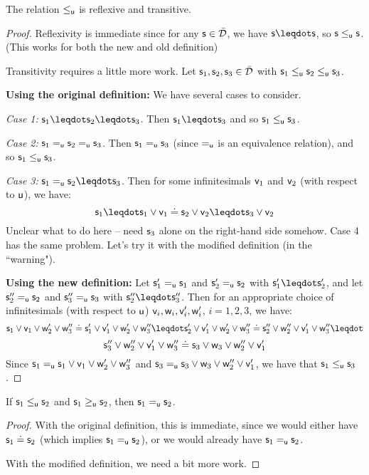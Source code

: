 \documentclass{article}
\begin{document}
\begin{prop}
The relation $\lequ$ is reflexive and transitive.  
\end{prop}
\begin{proof}
Reflexivity is immediate since for any $\stmt\in\tdomain$, we have $\stmt\finer\stmt$, so $\stmt\lequ\stmt$. (This works for both the new and old definition)

Transitivity requires a little more work. Let $\stmt_1,\stmt_2,\stmt_3\in\tdomain$ with $\stmt_1\lequ\stmt_2\lequ\stmt_3$. 

{\bf Using the original definition:}
We have several cases to consider. 

\emph{Case 1:} $\stmt_1\finer\stmt_2\finer\stmt_3$. Then $\stmt_1\finer\stmt_3$ and so $\stmt_1\lequ\stmt_3$. 

\emph{Case 2:} $\stmt_1\equ\stmt_2\equ\stmt_3$. Then $\stmt_1\equ\stmt_3$ (since $\equ$ is an equivalence relation), and so $\stmt_1\lequ\stmt_3$. 

\emph{Case 3:} $\stmt_1\equ\stmt_2\finer\stmt_3$. Then for some infinitesimals $\stmt[v]_1$ and $\stmt[v]_2$ (with respect to $\stmt[u]$), we have:
$$
\stmt_1\finer\stmt_1\OR\stmt[v]_1\eqgran\stmt_2\OR\stmt[v]_2\finer\stmt_3\OR\stmt[v]_2
$$
Unclear what to do here -- need $\stmt_3$ alone on the right-hand side somehow. Case 4 has the same problem. Let's try it with the modified definition (in the ``warning").

{\bf Using the new definition:}
Let $\stmt_1'\equ\stmt_1$ and $\stmt_2'\equ\stmt_2$ with $\stmt_1'\finer\stmt_2'$, and let $\stmt_2''\equ\stmt_2$ and $\stmt_3''\equ\stmt_3$ with $\stmt_2''\finer\stmt_3''$. 
Then for an appropriate choice of infinitesimals (with respect to $\stmt[u]$) $\stmt[v]_i,\stmt[w]_i,\stmt[v]_i',\stmt[w]_i'$, $i=1,2,3$, we have:
$$
\stmt_1\OR\stmt[v]_1\OR\stmt[w]_2'\OR\stmt[w]_3'' \eqgran \stmt_1'\OR\stmt[v]_1'\OR\stmt[w]_2'\OR\stmt[w]_3'' \finer \stmt_2'\OR\stmt[v]_1'\OR\stmt[w]_2'\OR\stmt[w]_3'' \eqgran \stmt_2''\OR\stmt[w]_2''\OR\stmt[v]_1'\OR\stmt[w]_3'' \finer
$$
$$
\stmt_3''\OR\stmt[w]_2''\OR\stmt[v]_1'\OR\stmt[w]_3'' \eqgran
\stmt_3\OR\stmt[w]_3 \OR\stmt[w]_2''\OR\stmt[v]_1'
$$
Since $\stmt_1 \equ \stmt_1\OR\stmt[v]_1\OR\stmt[w]_2'\OR\stmt[w]_3''$ and $\stmt_3 \equ \stmt_3\OR\stmt[w]_3 \OR\stmt[w]_2''\OR\stmt[v]_1' $, we have that $\stmt_1\lequ\stmt_3$. 

\end{proof}

\begin{prop}
If $\stmt_1\lequ\stmt_2$ and $\stmt_1\gequ \stmt_2$, then $\stmt_1\equ\stmt_2$.
\end{prop}
\begin{proof}
With the original definition, this is immediate, since we would either have $\stmt_1\eqgran\stmt_2$ (which implies $\stmt_1\equ\stmt_2$), or we would already have $\stmt_1\equ\stmt_2$.

With the modified definition, we need a bit more work. 
\end{proof}
\end{document}
